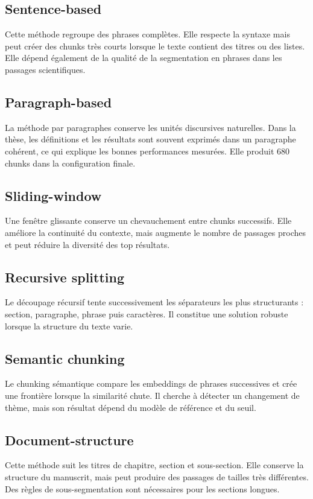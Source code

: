 \documentclass[12pt,a4paper,oneside]{report}
\begin{document}
\subsection{Sentence-based}
Cette méthode regroupe des phrases complètes. Elle respecte la syntaxe mais peut créer des chunks très courts lorsque le texte contient des titres ou des listes. Elle dépend également de la qualité de la segmentation en phrases dans les passages scientifiques.

\subsection{Paragraph-based}
La méthode par paragraphes conserve les unités discursives naturelles. Dans la thèse, les définitions et les résultats sont souvent exprimés dans un paragraphe cohérent, ce qui explique les bonnes performances mesurées. Elle produit 680 chunks dans la configuration finale.

\subsection{Sliding-window}
Une fenêtre glissante conserve un chevauchement entre chunks successifs. Elle améliore la continuité du contexte, mais augmente le nombre de passages proches et peut réduire la diversité des top résultats.

\subsection{Recursive splitting}
Le découpage récursif tente successivement les séparateurs les plus structurants : section, paragraphe, phrase puis caractères. Il constitue une solution robuste lorsque la structure du texte varie.

\subsection{Semantic chunking}
Le chunking sémantique compare les embeddings de phrases successives et crée une frontière lorsque la similarité chute. Il cherche à détecter un changement de thème, mais son résultat dépend du modèle de référence et du seuil.

\subsection{Document-structure}
Cette méthode suit les titres de chapitre, section et sous-section. Elle conserve la structure du manuscrit, mais peut produire des passages de tailles très différentes. Des règles de sous-segmentation sont nécessaires pour les sections longues.
\end{document}
